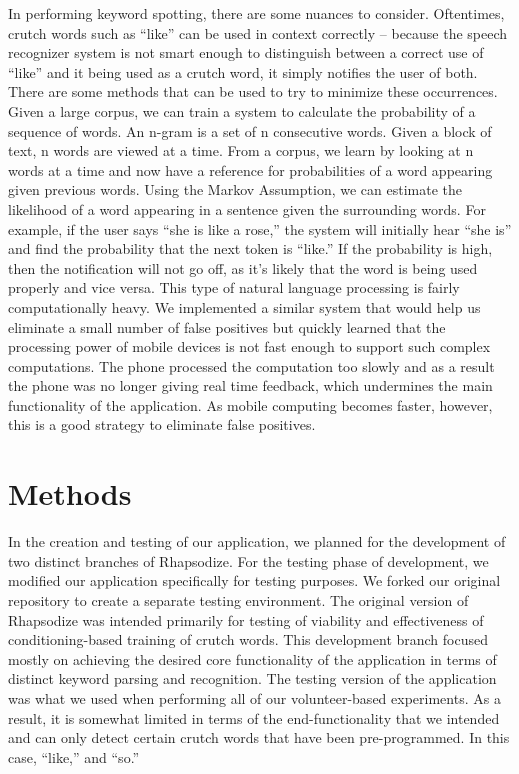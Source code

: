 \documentclass{sigchi}
\begin{document}
In performing keyword spotting, there are some nuances to consider. Oftentimes, crutch words such as “like” can be used in context correctly -- because the speech recognizer system is not smart enough to distinguish between a correct use of “like” and it being used as a crutch word, it simply notifies the user of both. There are some methods that can be used to try to minimize these occurrences. Given a large corpus, we can train a system to calculate the probability of a sequence of words. An n-gram is a set of n consecutive words. Given a block of text, n words are viewed at a time. From a corpus, we learn by looking at n words at a time and now have a reference for probabilities of a word appearing given previous words. Using the Markov Assumption, we can estimate the likelihood of a word appearing in a sentence given the surrounding words. For example, if the user says “she is like a rose,” the system will initially hear “she is” and find the probability that the next token is “like.” If the probability is high, then the notification will not go off, as it’s likely that the word is being used properly and vice versa. This type of natural language processing is fairly computationally heavy. We implemented a similar system that would help us eliminate a small number of false positives but quickly learned that the processing power of mobile devices is not fast enough to support such complex computations. The phone processed the computation too slowly and as a result the phone was no longer giving real time feedback, which undermines the main functionality of the application. As mobile computing becomes faster, however, this is a good strategy to eliminate false positives.

\section{Methods}

In the creation and testing of our application, we planned for the development of two distinct branches of Rhapsodize. For the testing phase of development, we modified our application specifically for testing purposes. We forked our original repository to create a separate testing environment. The original version of Rhapsodize was intended primarily for testing of viability and effectiveness of conditioning-based training of crutch words. This development branch focused mostly on achieving the desired core functionality of the application in terms of distinct keyword parsing and recognition. The testing version of the application was what we used when performing all of our volunteer-based experiments. As a result, it is somewhat limited in terms of the end-functionality that we intended and can only detect certain crutch words that have been pre-programmed. In this case, ``like,'' and ``so.''
\end{document}
